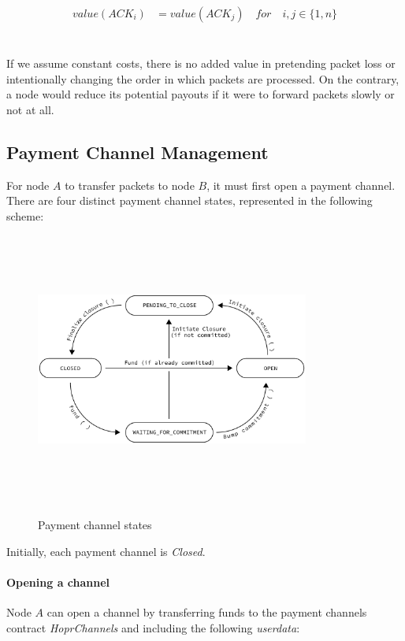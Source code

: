 \begin{align}
value ( ACK_i )  &  =value ( ACK_j ) \quad for \quad i,j\in \{1,n\}
\end{align}
\\~\\If we assume constant costs, there is no added value in pretending
packet loss or intentionally changing the order in which packets are processed.
On the contrary, a node would reduce its potential payouts if it were to forward
packets slowly or not at all.

\subsection{Payment Channel Management}
\label{sec:paymentchannelmanagement}

For node $A$ to transfer packets to node $B$, it must first open a payment channel. There are
four distinct payment channel states, represented in the following
scheme:

\begin{figure}[H]
    \centering
    \includegraphics[width=9cm,height=9cm,keepaspectratio]{../yellowpaper/images/statesTransition.png}
    \label{fig:payment channel states}
    \caption{Payment channel states}
\end{figure}
Initially, each payment channel is \textit{Closed}. 

\paragraph{Opening a channel} Node $A$ can open a channel by transferring funds to
the payment channels contract \textit{HoprChannels} and including the following
\textit{userdata}:

